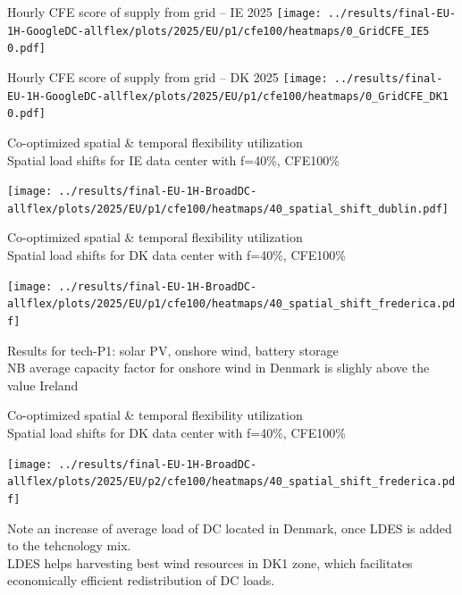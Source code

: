 

\begin{frame}{Hourly CFE score of supply from grid -- IE 2025}
  \vspace{.5cm}
  \texttt{[image: ../results/final-EU-1H-GoogleDC-allflex/plots/2025/EU/p1/cfe100/heatmaps/0\_GridCFE\_IE5 0.pdf]}
\end{frame}


\begin{frame}{Hourly CFE score of supply from grid -- DK 2025}
  \vspace{.5cm}
  \texttt{[image: ../results/final-EU-1H-GoogleDC-allflex/plots/2025/EU/p1/cfe100/heatmaps/0\_GridCFE\_DK1 0.pdf]}
\end{frame}




\begin{frame}{Co-optimized spatial \& temporal flexibility utilization \\
  Spatial load shifts for IE data center with f=40\%, CFE100\%}

  \vspace{.3cm}
  
  \centering
  \texttt{[image: ../results/final-EU-1H-BroadDC-allflex/plots/2025/EU/p1/cfe100/heatmaps/40\_spatial\_shift\_dublin.pdf]}

  \vspace{.3cm}

\end{frame}


\begin{frame}{Co-optimized spatial \& temporal flexibility utilization \\
  Spatial load shifts for DK data center with f=40\%, CFE100\%}

  \vspace{.3cm}
  
  \centering
  \texttt{[image: ../results/final-EU-1H-BroadDC-allflex/plots/2025/EU/p1/cfe100/heatmaps/40\_spatial\_shift\_frederica.pdf]}

  {\scriptsize
  Results for tech-P1: solar PV, onshore wind, battery storage \\
  NB average capacity factor for onshore wind in Denmark is slighly above the value Ireland
  }

\end{frame}


\begin{frame}{Co-optimized spatial \& temporal flexibility utilization \\
  Spatial load shifts for DK data center with f=40\%, CFE100\%}

  \vspace{.3cm}
  
  \centering
  \texttt{[image: ../results/final-EU-1H-BroadDC-allflex/plots/2025/EU/p2/cfe100/heatmaps/40\_spatial\_shift\_frederica.pdf]}

  {\scriptsize
  Note an increase of average load of DC located in Denmark, once LDES is added to the tehcnology mix. \\
  LDES helps harvesting best wind resources in DK1 zone, 
  which facilitates \alert{economically efficient redistribution} of DC loads.
  }
\end{frame}


